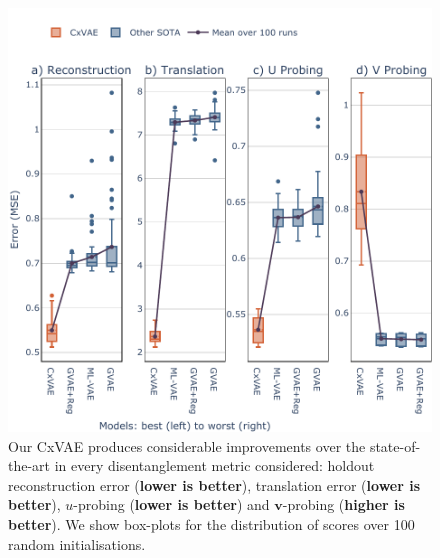 \documentclass[nohyperref]{article}
\theoremstyle{plain}
\theoremstyle{definition}
\theoremstyle{remark}
\begin{document}
\begin{figure}[t]
\vskip 0.2in
\begin{center}
\centerline{\includegraphics[width=\columnwidth]{files/results.pdf}}
\caption{Our CxVAE produces considerable improvements over the state-of-the-art in every disentanglement metric considered: holdout reconstruction error (\textbf{lower is better}), translation error (\textbf{lower is better}), $u$-probing (\textbf{lower is better}) and $\mathbf{v}$-probing (\textbf{higher is better}).  We show box-plots for the distribution of scores over 100 random initialisations. }
\label{fig:results}
\end{center}
\vskip -0.2in
\end{figure}
\end{document}

